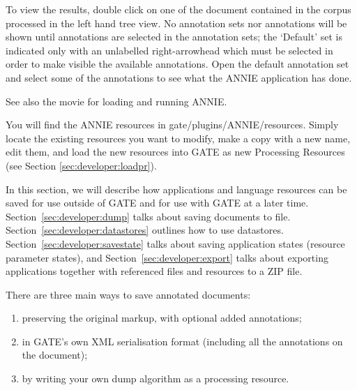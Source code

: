 To view the results, double click on one of the document contained in the
corpus processed in the left hand tree view. No annotation sets nor
annotations will be shown until annotations are selected in
the annotation sets; the `Default' set is indicated only with an unlabelled
right-arrowhead which must be selected in order to make visible the available
annotations. Open the default annotation set and select some of the annotations
to see what the ANNIE application has done.

See also the 
{movie for loading and running ANNIE}.


You will find the ANNIE resources in gate/plugins/ANNIE/resources. Simply locate
the existing resources you want to modify, make a copy with a new name, edit
them, and load the new resources into GATE as new Processing Resources (see
Section \ref{sec:developer:loadpr}).


In this section, we will describe how applications and language resources can
be saved for use outside of GATE and for use with GATE at a later time.
Section~\ref{sec:developer:dump} talks about saving documents to file.
Section~\ref{sec:developer:datastores} outlines how to use datastores.
Section~\ref{sec:developer:savestate} talks about saving application states
(resource parameter states), and Section~\ref{sec:developer:export} talks about 
exporting applications together with referenced files and resources to a ZIP file.


There are three main ways to save annotated documents:

\begin{enumerate}
\item\label{item:savepreserve}
preserving the original markup, with optional added annotations;
\item\label{item:saveasxml}
in GATE's own XML serialisation format (including all the annotations on the
document);
\item
by writing your own dump algorithm as a processing resource.
\end{enumerate}

